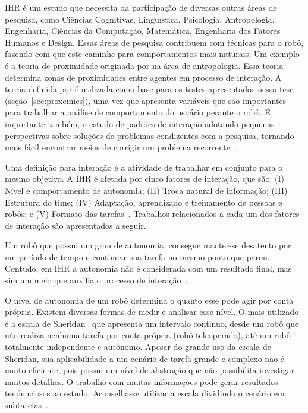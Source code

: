 IHR é um estudo que necessita da participação de diversas outras áreas de pesquisa, como Ciências Cognitivas, Linguística, Psicologia, Antropologia, Engenharia, Ciências da Computação, Matemática, Engenharia dos Fatores Humanos e Design. Essas áreas de pesquisa contribuem com técnicas para o robô, fazendo com que este caminhe para comportamentos mais naturais. Um exemplo é a teoria de proximidade originada por \textcite{hall:1969} na área de antropologia. Essa teoria determina zonas de proximidades entre agentes em processo de interação. A teoria definida por \textcite{hall:1969} é utilizada como base para os testes apresentados nessa tese (seção~\ref{sec:proxemics}), uma vez que apresenta variáveis que são importantes para trabalhar a análise de comportamento do usuário perante o robô. É importante também, o estudo de padrões de interação adotando pequenas perspectivas sobre soluções de problemas condizentes com a pesquisa, tornando mais fácil encontrar meios de corrigir um problema recorrente~\cite{goodrich:2007}.

Uma definição para interação é a atividade de trabalhar em conjunto para o mesmo objetivo. A IHR é afetada por cinco fatores de interação, que são: (I) Nível e comportamento de autonomia; (II) Troca natural de informação; (III) Estrutura do time; (IV) Adaptação, aprendizado e treinamento de pessoas e robôs; e (V) Formato das tarefas~\cite{goodrich:2007}. Trabalhos relacionados a cada um dos fatores de interação são apresentados a seguir.

Um robô que possui um grau de autonomia, consegue manter-se desatento por um período de tempo e continuar sua tarefa no mesmo ponto que parou. Contudo, em IHR a autonomia não é considerada com um resultado final, mas sim um meio que auxilia o processo de interação~\cite{goodrich:2007, weiss:2010}.

O nível de autonomia de um robô determina o quanto esse pode agir por conta própria. Existem diversas formas de medir e analisar esse nível. O mais utilizado é a escala de Sheridan~\cite{sheridan:1978} que apresenta um intervalo continuo, desde um robô que não realiza nenhuma tarefa por conta própria (robô teleoperado), até um robô totalmente independente e autônomo. Apesar do grande uso da escala de Sheridan, sua aplicabilidade a um cenário de tarefa grande e complexo não é muito eficiente, pois possui um nível de abstração que não possibilita investigar muitos detalhes. O trabalho com muitas informações pode gerar resultados tendenciosos ao estudo. Aconselha-se utilizar a escala dividindo o cenário em subtarefas~\cite{goodrich:2007, weiss:2010}.

